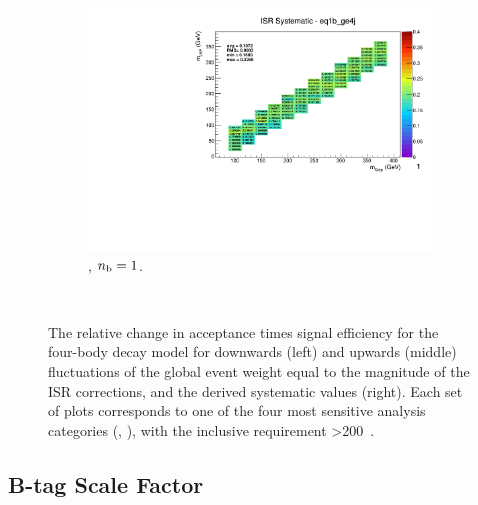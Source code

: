 \begin{figure}[ht!]
\begin{subfigure}[b]{0.32\textwidth}
    \includegraphics[width=\textwidth, page=1]{Figs/sms/t2degen/v19_3/systs/T2_4body_ISR_eq1b_ge4j.pdf}
    \caption{\njhigh, $n_{\text{b}} = 1$.}
  \end{subfigure}\\
  \caption{The relative change in acceptance times signal efficiency for the
  four-body decay model for downwards (left) and upwards (middle) fluctuations
  of the global event weight equal to the magnitude of the ISR corrections,
  and the derived systematic values (right). Each set of plots corresponds
  to one of the four most sensitive analysis categories (\nb, \nj), with the
  inclusive requirement \HT>200~\gev.}
  \label{fig:sms-isr-t2degen}
\end{figure}


\newpage
\subsection*{B-tag Scale Factor}
\label{sec:t2degen_btag_plots}

